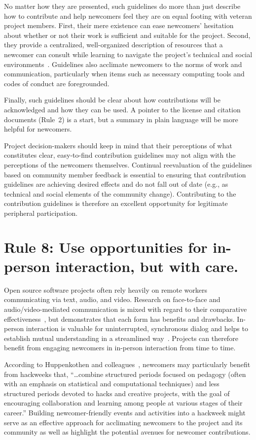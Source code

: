 \documentclass[10pt,letterpaper]{article}
\newcommand{\rulemajor}[1]{\section*{#1}}
\begin{document}
No matter how they are presented,
such guidelines do more than just describe how to contribute
and help newcomers feel they are on equal footing with veteran project members.
First,
their mere existence can ease newcomers' hesitation
about whether or not their work is sufficient and suitable for the project.
Second,
they provide a centralized, well-organized description of resources
that a newcomer can consult while learning to navigate the project's technical and social environments~\cite{zanatta2017}.
Guidelines also acclimate newcomers to the norms of work and communication,
particularly when items such as necessary computing tools and codes of conduct are foregrounded.

Finally,
such guidelines should be clear about how contributions will be acknowledged
and how they can be used.
A pointer to the license and citation documents (Rule~2) is a start,
but a summary in plain language will be more helpful for newcomers.

Project decision-makers should keep in mind
that their perceptions of what constitutes clear, easy-to-find contribution guidelines
may not align with the perceptions of the newcomers themselves.
Continual reevaluation of the guidelines based on community member feedback is essential
to ensuring that contribution guidelines are achieving desired effects
and do not fall out of date (e.g., as technical and social elements of the community change).
Contributing to the contribution guidelines is therefore
an excellent opportunity for legitimate peripheral participation.

\rulemajor{Rule 8: Use opportunities for in-person interaction, but with care.}

Open source software projects often rely heavily on remote workers communicating via text, audio, and video.
Research on face-to-face and audio/video-mediated communication is mixed
with regard to their comparative effectiveness~\cite{doherty1997,gallupe1990,nardi2002},
but demonstrates that each form has benefits and drawbacks.
In-person interaction is valuable for uninterrupted, synchronous dialog
and helps to establish mutual understanding in a streamlined way~\cite{omalley1996}.
Projects can therefore benefit from engaging newcomers in in-person interaction from time to time.

According to Huppenkothen and colleagues~\cite{huppenkothen2018},
newcomers may particularly benefit from hackweeks that,
``{\ldots}combine structured periods focused on pedagogy
(often with an emphasis on statistical and computational techniques)
and less structured periods devoted to hacks and creative projects,
with the goal of encouraging collaboration and learning among people at various stages of their career.''
Building newcomer-friendly events and activities into a hackweek
might serve as an effective approach for acclimating newcomers to the project and its community
as well as highlight the potential avenues for newcomer contributions.
\end{document}

